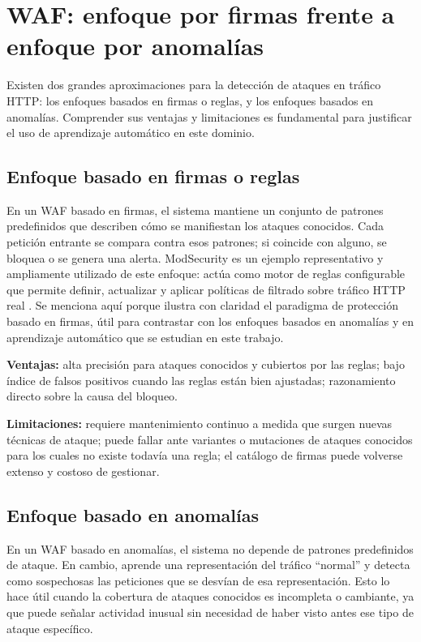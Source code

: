 \documentclass[12pt,oneside]{report}
\begin{document}
\section{WAF: enfoque por firmas frente a enfoque por anomalías}

Existen dos grandes aproximaciones para la detección de ataques en tráfico HTTP: los enfoques basados en firmas o reglas, y los enfoques basados en anomalías. Comprender sus ventajas y limitaciones es fundamental para justificar el uso de aprendizaje automático en este dominio.

\subsection{Enfoque basado en firmas o reglas}

En un WAF basado en firmas, el sistema mantiene un conjunto de patrones predefinidos que describen cómo se manifiestan los ataques conocidos. Cada petición entrante se compara contra esos patrones; si coincide con alguno, se bloquea o se genera una alerta. ModSecurity es un ejemplo representativo y ampliamente utilizado de este enfoque: actúa como motor de reglas configurable que permite definir, actualizar y aplicar políticas de filtrado sobre tráfico HTTP real \cite{modsecurity_site}. Se menciona aquí porque ilustra con claridad el paradigma de protección basado en firmas, útil para contrastar con los enfoques basados en anomalías y en aprendizaje automático que se estudian en este trabajo.

\textbf{Ventajas:} alta precisión para ataques conocidos y cubiertos por las reglas; bajo índice de falsos positivos cuando las reglas están bien ajustadas; razonamiento directo sobre la causa del bloqueo.

\textbf{Limitaciones:} requiere mantenimiento continuo a medida que surgen nuevas técnicas de ataque; puede fallar ante variantes o mutaciones de ataques conocidos para los cuales no existe todavía una regla; el catálogo de firmas puede volverse extenso y costoso de gestionar.

\subsection{Enfoque basado en anomalías}

En un WAF basado en anomalías, el sistema no depende de patrones predefinidos de ataque. En cambio, aprende una representación del tráfico ``normal'' y detecta como sospechosas las peticiones que se desvían de esa representación. Esto lo hace útil cuando la cobertura de ataques conocidos es incompleta o cambiante, ya que puede señalar actividad inusual sin necesidad de haber visto antes ese tipo de ataque específico.
\end{document}
